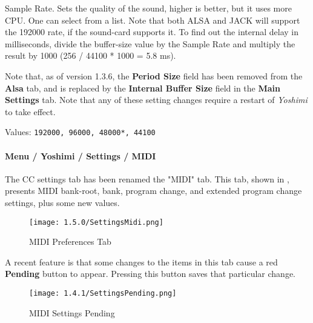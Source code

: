    Sample Rate.
   Sets the quality of the sound, higher is better, but it uses more CPU.  One
   can select from a list.  Note that both ALSA and JACK will support the
   192000 rate, if the sound-card supports it.  To find out the internal delay
   in milliseconds, divide the buffer-size value by the Sample Rate and
   multiply the result by 1000 (256 / 44100 * 1000 = 5.8 ms).

   Note that, as of version 1.3.6, the \textbf{Period Size} field has been
   removed from the \textbf{Alsa} tab, and is replaced by the 
   \textbf{Internal Buffer Size} field in the \textbf{Main Settings} tab.
   Note that any of these setting changes require a restart of \textsl{Yoshimi}
   to take effect.
   

   Values: \texttt{192000, 96000, 48000*, 44100}

\paragraph{Menu / Yoshimi / Settings / MIDI}
\label{paragraph:menu_yoshimi_settings_ccs}

   The CC settings tab has been renamed the "MIDI" tab.
   This tab, shown in
   ,
   presents MIDI bank-root, bank, program change, and extended program
   change settings, plus some new values.

\begin{figure}[H]
   \centering 
   \texttt{[image: 1.5.0/SettingsMidi.png]}
   \caption[MIDI Preferences]{MIDI Preferences Tab}
   \label{fig:yoshimi_settings_cc}
\end{figure}

   A recent feature is that some changes to the items in this
   tab cause a red \textbf{Pending} button to appear.  Pressing this
   button saves that particular change.

\begin{figure}[H]
   \centering 
   \texttt{[image: 1.4.1/SettingsPending.png]}
   \caption[MIDI Settings Pending]{MIDI Settings Pending}
   \label{fig:yoshimi_settings_pending}
\end{figure}

